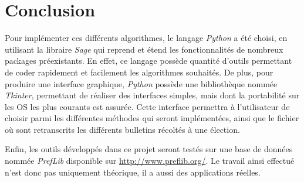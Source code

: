 \documentclass[12pt]{article}
\begin{document}
\section*{Conclusion}

Pour impl\'{e}menter ces différents algorithmes, le langage \emph{Python} a été choisi, en utilisant la libraire \emph{Sage} qui reprend et \'{e}tend les fonctionnalit\'{e}s de nombreux packages préexistants. En effet, ce langage possède quantité d'outils permettant de coder rapidement et facilement les algorithmes souhaités. De plus, pour produire une interface graphique, \emph{Python} possède une bibliothèque nommée \emph{Tkinter}, permettant de réaliser des interfaces simples, mais dont la portabilité sur les OS les plus courants est assurée. Cette interface permettra à l'utilisateur de choisir parmi les différentes méthodes qui seront implémentées, ainsi que le fichier où sont retranscrits les différents bulletins récoltés à une élection.

Enfin, les outils développés dans ce projet seront testés sur une base de données nommée \emph{PrefLib} disponible sur \url{http://www.preflib.org/}. Le travail ainsi effectué n'est donc pas uniquement théorique, il a aussi des applications réelles.
\end{document}
